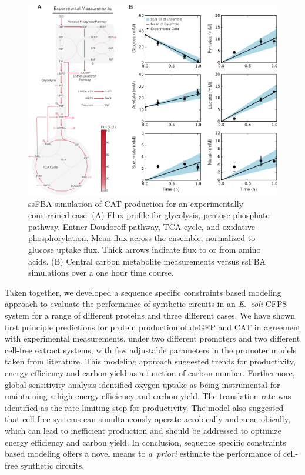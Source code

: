 \documentclass[journal=asbcd6,manuscript=article]{achemso}
\begin{document}
\begin{figure}[t!]
\includegraphics[width=1.00\textwidth]{./Figures/Exp_flux.pdf}
\caption{ssFBA simulation of CAT production for an experimentally constrained case. (A) Flux profile for glycolysis, pentose phosphate pathway, Entner-Doudoroff pathway, TCA cycle, and oxidative phosphorylation.  Mean flux across the ensemble, normalized to glucose uptake flux. Thick arrows indicate flux to or from amino acids. (B) Central carbon metabolite measurements versus ssFBA simulations over a one hour time course.}
\label{fig:flux_exp}
\end{figure}

Taken together, we developed a sequence specific constraints based modeling approach to evaluate the performance of synthetic circuits in an \emph{E.~coli} CFPS system for a range of different proteins and three different cases.
We have shown first principle predictions for protein production of deGFP and CAT in agreement with experimental measurements, under two different promoters and two different cell-free extract systems, with few adjustable parameters in the promoter models taken from literature.
This modeling approach suggested trends for productivity, energy efficiency and carbon yield as a function of carbon number.
Furthermore, global sensitivity analysis identified oxygen uptake as being instrumental for maintaining a high energy efficiency and carbon yield.
The translation rate was identified as the rate limiting step for productivity.
The model also suggested that cell-free systems can simultaneously operate aerobically and anaerobically, which can lead to inefficient production and should be addressed to optimize energy efficiency and carbon yield.
In conclusion, sequence specific constraints based modeling offers a novel means to \emph{a~priori} estimate the performance of cell-free synthetic circuits.
\end{document}
